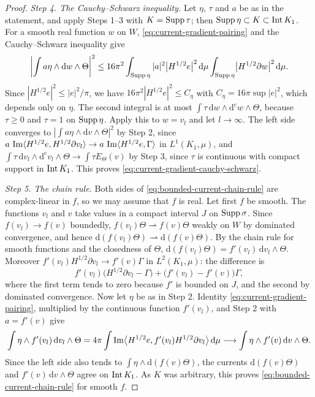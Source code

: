 \begin{proof}
\emph{Step 4. The Cauchy--Schwarz inequality.}
Let $\eta$, $\tau$ and $a$ be as in the statement, and apply Steps 1--3 with $K=\operatorname{Supp}\tau$; then $\operatorname{Supp}\eta\subset K\subset\operatorname{Int} K_1$. For a smooth real function $w$ on $W$, \eqref{eq:current-gradient-pairing} and the Cauchy--Schwarz inequality give
\[
 \left|\int a\eta\wedge\mathrm dw\wedge\Theta\right|^2
 \leq16\pi^2\int_{\operatorname{Supp}\eta}|a|^2\bigl|H^{1/2}e\bigr|^2\,\mathrm d\mu
      \int_{\operatorname{Supp}\eta}\bigl|H^{1/2}\partial w\bigr|^2\,\mathrm d\mu.
\]
Since $|H^{1/2}e|^2\leq|e|^2/\pi$, we have $16\pi^2|H^{1/2}e|^2\leq C_\eta$ with $C_\eta=16\pi\sup|e|^2$, which depends only on $\eta$. The second integral is at most $\int\tau\,\mathrm dw\wedge\mathrm d^{\mathrm c}w\wedge\Theta$, because $\tau\geq0$ and $\tau=1$ on $\operatorname{Supp}\eta$. Apply this to $w=v_l$ and let $l\to\infty$. The left side converges to $|\int a\eta\wedge\mathrm dv\wedge\Theta|^2$ by Step 2, since $a\,\operatorname{Im}\langle H^{1/2}e,H^{1/2}\partial v_l\rangle\to a\,\operatorname{Im}\langle H^{1/2}e,\Gamma\rangle$ in $L^1(K_1,\mu)$, and $\int\tau\,\mathrm dv_l\wedge\mathrm d^{\mathrm c}v_l\wedge\Theta\to\int\tau E_\Theta(v)$ by Step 3, since $\tau$ is continuous with compact support in $\operatorname{Int} K_1$. This proves \eqref{eq:current-gradient-cauchy-schwarz}.

\emph{Step 5. The chain rule.}
Both sides of \eqref{eq:bounded-current-chain-rule} are complex-linear in $f$, so we may assume that $f$ is real. Let first $f$ be smooth. The functions $v_l$ and $v$ take values in a compact interval $J$ on $\operatorname{Supp}\sigma$. Since $f(v_l)\to f(v)$ boundedly, $f(v_l)\Theta\rightharpoonup f(v)\Theta$ weakly on $W$ by dominated convergence, and hence $\mathrm d(f(v_l)\Theta)\rightharpoonup\mathrm d(f(v)\Theta)$. By the chain rule for smooth functions and the closedness of $\Theta$, $\mathrm d(f(v_l)\Theta)=f'(v_l)\,\mathrm dv_l\wedge\Theta$. Moreover $f'(v_l)H^{1/2}\partial v_l\to f'(v)\Gamma$ in $L^2(K_1,\mu)$: the difference is
\[
 f'(v_l)\bigl(H^{1/2}\partial v_l-\Gamma\bigr)+\bigl(f'(v_l)-f'(v)\bigr)\Gamma,
\]
where the first term tends to zero because $f'$ is bounded on $J$, and the second by dominated convergence. Now let $\eta$ be as in Step 2. Identity \eqref{eq:current-gradient-pairing}, multiplied by the continuous function $f'(v_l)$, and Step 2 with $a=f'(v)$ give
\[
 \int\eta\wedge f'(v_l)\,\mathrm dv_l\wedge\Theta
 =4\pi\int\operatorname{Im}\bigl\langle H^{1/2}e,f'(v_l)H^{1/2}\partial v_l\bigr\rangle\,\mathrm d\mu
 \longrightarrow\int\eta\wedge f'(v)\,\mathrm dv\wedge\Theta.
\]
Since the left side also tends to $\int\eta\wedge\mathrm d(f(v)\Theta)$, the currents $\mathrm d(f(v)\Theta)$ and $f'(v)\,\mathrm dv\wedge\Theta$ agree on $\operatorname{Int} K_1$. As $K$ was arbitrary, this proves \eqref{eq:bounded-current-chain-rule} for smooth $f$.


\end{proof}

